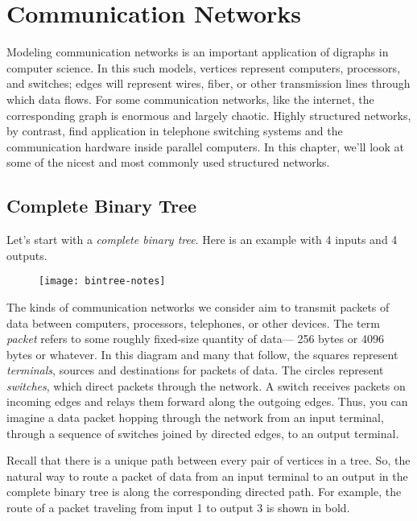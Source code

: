 
\chapter{Communication Networks}\label{comm_net_chap}

Modeling communication networks%
%
is an important application of digraphs in
computer science.  In this such models, vertices represent computers,
processors, and switches; edges will represent wires, fiber, or other
transmission lines through which data flows.  For some communication
networks, like the internet, the corresponding graph is enormous and
largely chaotic.  Highly structured networks, by contrast, find
application in telephone switching systems and the communication hardware
inside parallel computers.  In this chapter, we'll look at some of the
nicest and most commonly used structured networks.

\section{Complete Binary Tree}

Let's start with a \emph{complete 
binary tree}.  Here is an example
with 4 inputs and 4 outputs.
\begin{figure}
\texttt{[image: bintree-notes]}
\end{figure}
The kinds of communication networks we consider aim to transmit packets of
data between computers, processors, telephones, or other devices.  The
term \emph{packet} refers to some roughly fixed-size quantity of data---
256 bytes or 4096 bytes or whatever.  In this diagram and many that
follow, the squares represent \emph{terminals}, sources and destinations
for packets of data.  The circles represent \emph{switches}, which direct
packets through the network.  A switch receives packets on incoming edges
and relays them forward along the outgoing edges.  Thus, you can imagine a
data packet hopping through the network from an input terminal, through a
sequence of switches joined by directed edges, to an output terminal.

Recall that there is a unique path between every pair of vertices
in a tree.  So, the natural way to route a packet of data from an input
terminal to an output in the complete binary tree is along the
corresponding directed path.  For example, the route of a packet traveling
from input 1 to output 3 is shown in bold.

